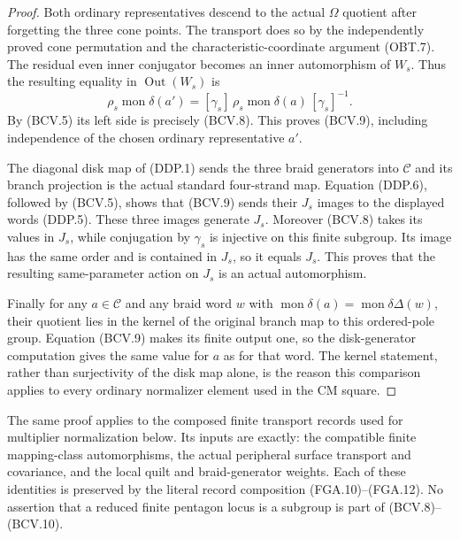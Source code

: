 \begin{proof}
Both ordinary representatives descend to the actual
$\Omega$ quotient after forgetting the three cone points.
The transport does so by the independently proved cone
permutation and the characteristic-coordinate argument
(OBT.7).  The residual even inner conjugator becomes an
inner automorphism of $W_s$.
Thus the resulting equality in $\operatorname{Out}(W_s)$ is
\[
 \rho_s\operatorname{mon}\delta(a')
       =[\gamma_s]\,
          \rho_s\operatorname{mon}\delta(a)\,[\gamma_s]^{-1}.
                                                               \tag{BCV.10}
\]
By (BCV.5) its left side is precisely (BCV.8).
This proves (BCV.9), including independence of the chosen
ordinary representative $a'$.

The diagonal disk map of (DDP.1) sends the three braid
generators into $\mathcal C$ and its branch projection is
the actual standard four-strand map.
Equation (DDP.6), followed by (BCV.5), shows that (BCV.9)
sends their $J_s$ images to the displayed words (DDP.5).
These three images generate $J_s$.
Moreover (BCV.8) takes its values in $J_s$, while
conjugation by $\gamma_s$ is injective on this finite
subgroup.  Its image has the same order and is contained
in $J_s$, so it equals $J_s$.
This proves that the resulting same-parameter action on
$J_s$ is an actual automorphism.

Finally for any $a\in\mathcal C$ and any braid word $w$
with $\operatorname{mon}\delta(a)=\operatorname{mon}\delta\Delta(w)$,
their quotient lies in the kernel of the original branch
map to this ordered-pole group.  Equation (BCV.9) makes
its finite output one, so the disk-generator computation
gives the same value for $a$ as for that word.
The kernel statement, rather than surjectivity of the
disk map alone, is the reason this comparison applies to
every ordinary normalizer element used in the CM square.
\end{proof}

The same proof applies to the composed finite transport
records used for multiplier normalization below.  Its
inputs are exactly: the compatible finite mapping-class
automorphisms, the actual peripheral surface transport
and covariance, and the local quilt and braid-generator
weights.  Each of these identities is preserved by the
literal record composition (FGA.10)--(FGA.12).
No assertion that a reduced finite pentagon locus is a
subgroup is part of (BCV.8)--(BCV.10).
